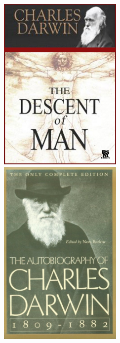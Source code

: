 \documentclass[10pt]{beamer}
\begin{document}
\begin{frame}
\begin{columns}
		\begin{column}{0.5\textwidth}
			\begin{center}
				\includegraphics[width=0.45\textwidth]{figures/book3.jpg}\\
				\vspace{0.25cm}
				\includegraphics[width=0.45\textwidth]{figures/book4.jpg}
			\end{center}
		\end{column}
	\end{columns}
\end{frame}  
\end{document}
